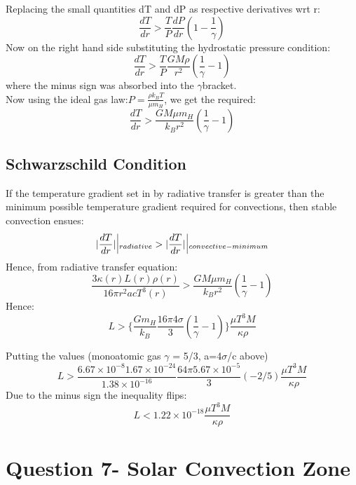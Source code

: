 \documentclass[11pt]{article}
\begin{document}
	Replacing the small quantities dT and dP as respective derivatives wrt r:
	\[
		\frac{dT}{dr} > \frac{T}{P}\frac{dP}{dr}(1-\frac{1}{\gamma})
	\]
	Now on the right hand side substituting the hydrostatic pressure condition:
	\[
		\frac{dT}{dr}> \frac{T}{P}\frac{GM\rho}{r^2}(\frac{1}{\gamma}-1)
	\]
	where the minus sign was absorbed into the $\gamma$bracket.\\
	Now using the ideal gas law:\(P = \frac{\rho k_BT}{\mu m_H}\), we get the required:
	\[
		\boxed{\frac{dT}{dr} > \frac{GM\mu m_H}{k_B r^2}(\frac{1}{\gamma} - 1)}
	\]
	
	\subsection{Schwarzschild Condition}
	
	If the temperature gradient set in by radiative transfer is greater than the minimum possible temperature gradient required for convections, then stable convection ensues:
	\[
		|\frac{dT}{dr}|\, \vline_{\, radiative} > |\frac{dT}{dr}|\, \vline_{\, convective-minimum}
	\]
	Hence, from radiative transfer equation:
	\[
		\frac{3\kappa(r)L(r)\rho(r)}{16\pi r^2acT^3(r)}>\frac{GM\mu m_H}{k_B r^2}(\frac{1}{\gamma} - 1)
	\]
	Hence:
	\[
		L > \{\frac{Gm_H}{k_B}\frac{16\pi4\sigma}{3}(\frac{1}{\gamma}-1)\}\frac{\mu T^3M}{\kappa\rho}
	\]
	
	Putting the values (monoatomic gas $\gamma$ = 5/3, a=4$\sigma$/c above)
	\[
		L > \frac{6.67\times10^{-8} 1.67\times 10^{-24}}{1.38\times 10^{-16}}\frac{64\pi5.67\times10^{-5}}{3}(-2/5)\frac{\mu T^3M}{\kappa\rho}
	\]
	Due to the minus sign the inequality flips:
	\[
		\boxed{L<1.22 \times 10^{-18} \frac{\mu T^3M}{\kappa\rho}}
	\]
	
	\section{\color{teal} Question 7- Solar Convection Zone}
\end{document}
